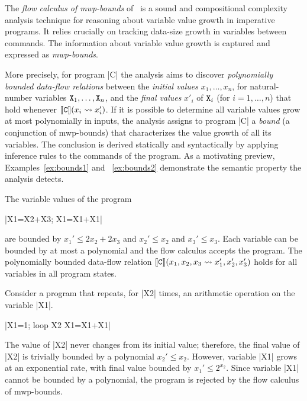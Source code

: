 The \emph{flow calculus of mwp-bounds} of~\textcite{jones2009} is a sound and compositional complexity analysis technique for reasoning about variable value growth in imperative programs.
It relies crucially on tracking data-size growth in variables between commands.
The information about variable value growth is captured and expressed as \emph{mwp-bounds}.

More precisely, for program \pr|C| the analysis aims to discover \emph{polynomially bounded data-flow relations} between the \emph{initial values} \(x_1,\ldots,x_n\), for natural-number variables \(\prm{X}_1,\ldots,\prm{X}_n\), and the \emph{final values} \(x'_i\) of \(\prm{X}_i\) (for \(i=1,\ldots,n\)) that hold whenever \(\sem{\prm{C}}(x_i \rightsquigarrow x^\prime_i)\).
If it is possible to determine all variable values grow at most polynomially in inputs, the analysis assigns to program \pr|C| a \emph{bound} (a conjunction of mwp-bounds) that characterizes the value growth of all its variables.
The conclusion is derived statically and syntactically by applying inference rules to the commands of the program.
As a motivating preview, Examples~\ref{ex:bounds1} and ~\ref{ex:bounds2} demonstrate the semantic property the analysis detects.

\begin{example}\label{ex:bounds1}
The variable values of the program
\begin{center}
\pr|X1=X2+X3; X1=X1+X1|
\end{center}
are bounded by \(x_1' \leq 2x_2 + 2x_3\) and \(x_2' \leq x_2\) and \(x_3' \leq x_3\).
Each variable can be bounded by at most a polynomial and the flow calculus accepts the program.
The polynomially bounded data-flow relation \(\sem{\prm{C}}(x_1,x_2,x_3 \rightsquigarrow x^\prime_1,x^\prime_2,x^\prime_3)\)
holds for all variables in all program states.
\end{example}

\begin{example}\label{ex:bounds2}
Consider a program that repeats, for \pr|X2| times, an arithmetic operation on the variable \pr|X1|.
\begin{center}
\pr|X1=1; loop X2 {X1=X1+X1}|
\end{center}
The value of \pr|X2| never changes from its initial value;
therefore, the final value of \pr|X2| is trivially bounded by a polynomial \(x_2' \leq x_2\).
However, variable \pr|X1| grows at an exponential rate, with final value bounded by \(x_1' \leq 2^{x_2}\).
Since variable \pr|X1| cannot be bounded by a polynomial, the program is rejected by the flow calculus of mwp-bounds.
\end{example}


